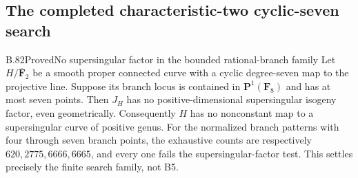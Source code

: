 \subsection{The completed characteristic-two cyclic-seven search}

\begin{claim}{B.82}{Proved}{No supersingular factor in the bounded rational-branch family}
Let $H/\overline{\mathbf F}_2$ be a smooth proper connected curve
with a cyclic degree-seven map to the projective line. Suppose its
branch locus is contained in $\mathbf P^1(\mathbf F _8)$ and has at
most seven points. Then $J_H$ has no positive-dimensional
supersingular isogeny factor, even geometrically. Consequently $H$
has no nonconstant map to a supersingular curve of positive genus.
For the normalized branch patterns with four through seven branch
points, the exhaustive counts are respectively
$620,2775,6666,6665$, and every one fails the supersingular-factor
test. This settles precisely the finite search family, not B5.
\end{claim}

